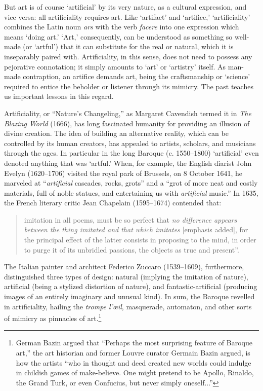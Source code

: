 \documentclass{article}
\begin{document}
But art is of course ‘artificial’ by its very nature, as a cultural expression, and vice versa: all artificiality requires art. Like ‘artifact’ and ‘artifice,’ ‘artificiality’ combines the Latin noun \textit{ars} with the verb \textit{facere} into one expression which means ‘doing art.’ ‘Art,’ consequently, can be understood as something so well-made (or ‘artful’) that it can substitute for the real or natural, which it is inseparably paired with. Artificiality, in this sense, does not need to possess any pejorative connotation; it simply amounts to ‘art’ or ‘artistry’ itself. As man-made contraption, an artifice demands art, being the craftsmanship or ‘science’ required to entice the beholder or listener through its mimicry. The past teaches us important lessons in this regard.

Artificiality, or “Nature’s Changeling,”\cite[p. 51]{cavendish2021blazing} as Margaret Cavendish termed it in \textit{The Blazing World} (1666), has long fascinated humanity for providing an illusion of divine creation. The idea of building an alternative reality, which can be controlled by its human creators, has appealed to artists, scholars, and musicians through the ages. In particular in the long Baroque (c. 1550–1800) ‘artificial’ even denoted anything that was ‘artful.’ When, for example, the English diarist John Evelyn (1620–1706) visited the royal park of Brussels, on 8 October 1641, he marveled at “\textit{artificial} cascades, rocks, grots” and a “grot of more neat and costly materials, full of noble statues, and entertaining us with \textit{artificial} music.”\cite[p. 37]{evelynDiaryJohnEvelyn1952} In 1635, the French literary critic Jean Chapelain (1595–1674) contended that: 
\begin{quote}
imitation in all poems, must be so perfect that \textit{no difference appears between the thing imitated and that which imitates} [emphasis added], for the principal effect of the latter consists in proposing to the mind, in order to purge it of its unbridled passions, the objects as true and present”. \cite[p. 115]{chapelain2007opuscules}
\end{quote}
The Italian painter and architect Federico Zuccaro (1539–1609), furthermore, distinguished three types of design: natural (implying the imitation of nature), artificial (being a stylized distortion of nature), and fantastic-artificial (producing images of an entirely imaginary and unusual kind).\cite{zuccaroIdeaPittoriScultori1607} In sum, the Baroque revelled in artificiality, hailing the \textit{trompe l’œil}, masquerade, automaton, and other sorts of mimicry as pinnacles of art.\footnote{German Bazin argued that “Perhaps the most surprising feature of Baroque art,” the art historian and former Louvre curator Germain Bazin argued, is how the artists “who in thought and deed created new worlds could indulge in childish games of make-believe. One might pretend to be Apollo, Rinaldo, the Grand Turk, or even Confucius, but never simply oneself...”} \cite[p. 10]{bazinBaroquePrinciplesStyles1968}
\end{document}
